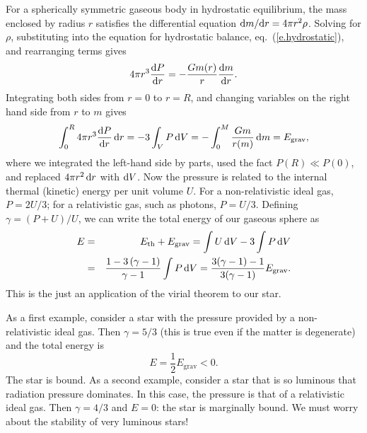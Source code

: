 For a spherically symmetric gaseous body in hydrostatic equilibrium, the mass enclosed by radius $r$ satisfies the differential equation $\mathrm{d} m/\mathrm{d} r = 4\pi r^{2}\rho$.  Solving for $\rho$, substituting into the equation for hydrostatic balance, eq.~(\ref{e.hydrostatic}), and rearranging terms gives
\[
4\pi r^{3} \frac{\mathrm{d} P}{\mathrm{d} r} = -\frac{Gm(r)}{r} \frac{\mathrm{d} m}{\mathrm{d} r}.
\]
Integrating both sides from $r = 0$ to $r = R$, and changing variables on the right hand side from $r$ to $m$ gives
\begin{equation}\label{e.virial-1}
\int_{0}^{R} 4\pi r^{3}\frac{\mathrm{d} P}{\mathrm{d} r}\,\mathrm{d} r = -3\int_{V} P\, \mathrm{d} V = -\int_{0}^{M}\frac{Gm}{r(m)}\,\mathrm{d} m = E_{\mathrm{grav}},
\end{equation}
where we integrated the left-hand side by parts, used the fact $P(R) \ll P(0)$, and replaced $4\pi r^{2}\,\mathrm{d} r$ with $\mathrm{d} V$. Now the pressure is related to the internal thermal (kinetic) energy per unit volume $U$.  For a non-relativistic ideal gas, $P = 2 U/ 3$; for  a relativistic gas, such as photons, $P = U/3$.  Defining $\gamma = (P + U)/U$, we can write the total energy of our gaseous sphere as
\begin{eqnarray}
E &=& E_{\mathrm{th}} + E_{\mathrm{grav}} = \int U \,\mathrm{d} V-3\int P\,\mathrm{d} V \nonumber\\
  &=& \frac{1 -3\left(\gamma - 1\right) }{\gamma - 1} \int P\,\mathrm{d} V = \frac{3(\gamma-1)-1}{3(\gamma-1)} E_{\mathrm{grav}}.
\label{e.total-energy-gas}
\end{eqnarray}
This is the just an application of the virial theorem to our star.

As a first example, consider a star with the pressure provided by a non-relativistic ideal gas. Then $\gamma = 5/3$ (this is true even if the matter is degenerate) and the total energy is 
\[
E = \frac{1}{2}E_{\mathrm{grav}} < 0.
\]
The star is bound.  As a second example, consider a star that is so luminous that radiation pressure dominates. In this case, the pressure is that of a relativistic ideal gas. Then $\gamma = 4/3$ and $E = 0$: the star is marginally bound. We must worry about the stability of very luminous stars!

